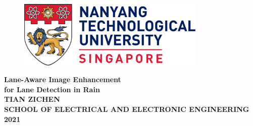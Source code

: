 \begin{titlepage}

\begin{figure}[h!]
\centering
\includegraphics[width=0.8\textwidth]{Title/NTU_logo.png}
\caption*{}
\label{fig:entropy} 
\end{figure}

\vspace{1in}

\centering
\Huge{\textbf{Lane-Aware Image Enhancement\\for Lane Detection in Rain}}\\[2in]

\LARGE{\textbf{TIAN ZICHEN}}\\[2in]

\normalsize{\textbf{SCHOOL OF ELECTRICAL AND ELECTRONIC ENGINEERING}}\\[0.2in]


\large{\textbf{2021}}
\end{titlepage}
\newpage